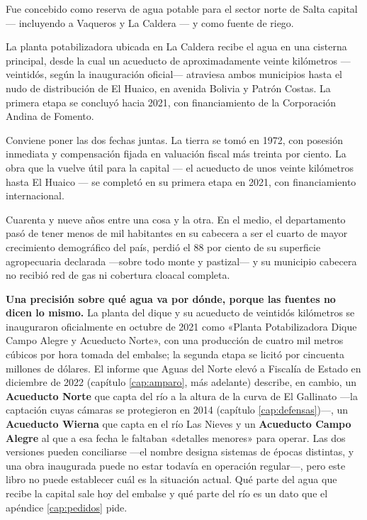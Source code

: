 Fue concebido como reserva de agua potable para el sector norte de Salta capital --- incluyendo a Vaqueros y La Caldera --- y como fuente de riego.

La planta potabilizadora ubicada en La Caldera recibe el agua en una cisterna principal, desde la cual un acueducto de aproximadamente veinte kilómetros ---veintidós, según la inauguración oficial--- atraviesa ambos municipios hasta el nudo de distribución de El Huaico, en avenida Bolivia y Patrón Costas. La primera etapa se concluyó hacia 2021, con financiamiento de la Corporación Andina de Fomento.

Conviene poner las dos fechas juntas. La tierra se tomó en 1972, con posesión inmediata y compensación fijada en valuación fiscal más treinta por ciento. La obra que la vuelve útil para la capital --- el acueducto de unos veinte kilómetros hasta El Huaico --- se completó en su primera etapa en 2021, con financiamiento internacional.

Cuarenta y nueve años entre una cosa y la otra. En el medio, el departamento pasó de tener menos de mil habitantes en su cabecera a ser el cuarto de mayor crecimiento demográfico del país, perdió el 88 por ciento de su superficie agropecuaria declarada ---sobre todo monte y pastizal--- y su municipio cabecera no recibió red de gas ni cobertura cloacal completa.

\begin{cautela}
\textbf{Una precisión sobre qué agua va por dónde, porque las fuentes no dicen lo mismo.} La planta del dique y su acueducto de veintidós kilómetros se inauguraron oficialmente en octubre de 2021 como «Planta Potabilizadora Dique Campo Alegre y Acueducto Norte», con una producción de cuatro mil metros cúbicos por hora tomada del embalse; la segunda etapa se licitó por cincuenta millones de dólares. El informe que Aguas del Norte elevó a Fiscalía de Estado en diciembre de 2022 (capítulo \ref{cap:amparo}, más adelante) describe, en cambio, un \textbf{Acueducto Norte} que capta del río a la altura de la curva de El Gallinato ---la captación cuyas cámaras se protegieron en 2014 (capítulo \ref{cap:defensas})---, un \textbf{Acueducto Wierna} que capta en el río Las Nieves y un \textbf{Acueducto Campo Alegre} al que a esa fecha le faltaban «detalles menores» para operar. Las dos versiones pueden conciliarse ---el nombre designa sistemas de épocas distintas, y una obra inaugurada puede no estar todavía en operación regular---, pero este libro no puede establecer cuál es la situación actual. Qué parte del agua que recibe la capital sale hoy del embalse y qué parte del río es un dato que el apéndice \ref{cap:pedidos} pide.
\end{cautela}

